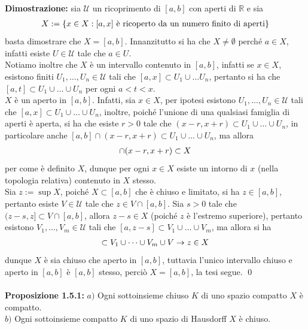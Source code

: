 \documentclass{article}
\begin{document}
\textbf{Dimostrazione:} sia $\mathcal{U}$ un ricoprimento di $[a, b]$ con aperti di $\mathbb{R}$ e sia
\begin{gather}
    X := \{ x \in X : [a, x] \text{ è ricoperto da un numero finito di aperti} \} \notag
\end{gather}
basta dimostrare che $X = [a, b]$. Innanzitutto si ha che $X \neq \emptyset$ perché $a \in X$, infatti esiste $U \in \mathcal{U}$ tale che $a \in U$. \\
Notiamo inoltre che $X$ è un intervallo contenuto in $[a, b]$, infatti se $x \in X$, esistono finiti $U_1, \dots, U_n \in \mathcal{U}$ tali che $[a, x] \subset U_1 \cup \dots U_n$, pertanto si ha che $[a, t] \subset U_1 \cup \dots \cup U_n$ per ogni $a < t < x$. \\
$X$ è un aperto in $[a, b]$. Infatti, sia $x \in X$, per ipotesi esistono $U_1, \dots, U_n \in \mathcal{U}$ tali che $[a, x] \subset U_1 \cup \dots \cup U_n$, inoltre, poiché l'unione di una qualsiasi famiglia di aperti è aperta, si ha che esiste $r > 0$ tale che $(x - r, x+ r) \subset U_1 \cup \dots \cup U_n$, in particolare anche $[a, b] \cap (x - r, x + r) \subset U_1 \cup \dots \cup U_n$, ma allora
\begin{gather}
    [a, b] \cap (x - r, x + r) \subset X \notag
\end{gather}
per come è definito $X$, dunque per ogni $x \in X$ esiste un intorno di $x$ (nella topologia relativa) contenuto in $X$ stesso. \\
Sia $z := \sup X$, poiché $X \subset [a, b]$ che è chiuso e limitato, si ha $z \in [a, b]$, pertanto esiste $V \in \mathcal{U}$ tale che $z \in V \cap [a, b]$. Sia $s > 0$ tale che $(z - s, z] \subset V \cap [a, b]$, allora $z - s \in X$ (poiché $z$ è l'estremo superiore), pertanto esistono $V_1, \dots, V_m \in \mathcal{U}$ tali che $[a, z - s] \subset V_1 \cup \dots \cup V_m$, ma allora si ha
\begin{gather}
    [a, z] \subset V_1 \cup \dots \cup V_m \cup V \rightarrow z \in X \notag
\end{gather}
dunque $X$ è sia chiuso che aperto in $[a, b]$, tuttavia l'unico intervallo chiuso e aperto in $[a, b]$ è $[a, b]$ stesso, perciò $X = [a, b]$, la tesi segue. \qed \\ \\
\textbf{Proposizione 1.5.1:} $a)$ Ogni sottoinsieme chiuso $K$ di uno spazio compatto $X$ è compatto. \\
$b)$ Ogni sottoinsieme compatto $K$ di uno spazio di Hausdorff $X$ è chiuso. \\
\end{document}
